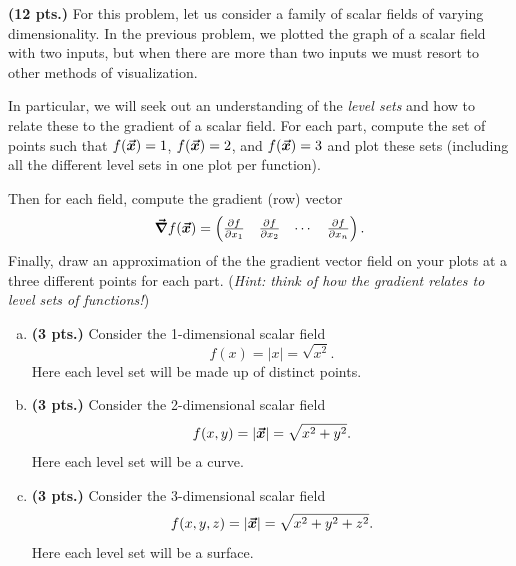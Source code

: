 \documentclass[12pt]{article} %
\begin{document}
\newpage
\begin{problem}
\textbf{(12 pts.)} For this problem, let us consider a family of scalar fields of varying dimensionality. In the previous problem, we plotted the graph of a scalar field with two inputs, but when there are more than two inputs we must resort to other methods of visualization.

In particular, we will seek out an understanding of the \emph{level sets} and how to relate these to the gradient of a scalar field. For each part, compute the set of points such that $f(\boldsymbol{\vec{x}})=1$, $f(\boldsymbol{\vec{x}})=2$, and $f(\boldsymbol{\vec{x}})=3$ and plot these sets (including all the different level sets in one plot per function).

Then for each field, compute the gradient (row) vector
\[
\boldsymbol{\vec{\nabla}} f(\boldsymbol{\vec{x}}) = \begin{pmatrix} \frac{\partial f}{\partial x_1} & \frac{\partial f}{\partial x_2} & \cdots & \frac{\partial f}{\partial x_n}\end{pmatrix}.
\]
Finally, draw an approximation of the the gradient vector field on your plots at a three different points for each part. (\emph{Hint: think of how the gradient relates to level sets of functions!})
\begin{enumerate}[(a)]
	\item \textbf{(3 pts.)} Consider the 1-dimensional scalar field
	\[
	f(x) = |x| = \sqrt{x^2}.
	\]
	Here each level set will be made up of distinct points.
	\item \textbf{(3 pts.)} Consider the 2-dimensional scalar field
	\[
	f(x,y) = |\boldsymbol{\vec{x}}| = \sqrt{x^2+y^2}.
	\]
	Here each level set will be a curve.
	\item \textbf{(3 pts.)} Consider the 3-dimensional scalar field
		\[
		f(x,y,z) = |\boldsymbol{\vec{x}}| = \sqrt{x^2+y^2+z^2}.
		\]
		Here each level set will be a surface.
\end{enumerate}
\end{problem}
\end{document}
